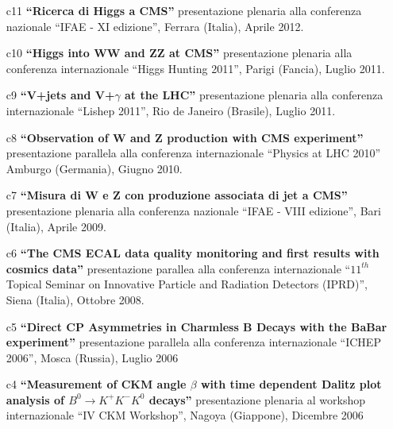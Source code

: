 \documentclass[11pt,twoside,a4paper]{article}
\begin{document}
\begin{enumerate}
\item [c11] \textbf{``Ricerca di Higgs a CMS''}
  presentazione plenaria alla conferenza nazionale ``IFAE - XI edizione'',
  Ferrara (Italia), Aprile 2012.
  \vspace{2mm}

\item [c10] \textbf{``Higgs into WW and ZZ at CMS''} presentazione
  plenaria alla conferenza internazionale ``Higgs Hunting 2011'',
  Parigi (Fancia), Luglio 2011.
  \vspace{2mm}

\item [c9] \textbf{``V+jets and V+$\gamma$ at the LHC''} presentazione
  plenaria alla conferenza internazionale ``Lishep 2011'', Rio de
  Janeiro (Brasile), Luglio 2011.
  \vspace{2mm}

\item [c8] \textbf{``Observation of W and Z production with CMS
  experiment'' } presentazione parallela alla conferenza
  internazionale ``Physics at LHC 2010'' Amburgo (Germania), Giugno
  2010.
  \vspace{2mm}

\item [c7] \textbf{``Misura di W e Z con produzione associata di jet a
  CMS''} presentazione plenaria alla conferenza nazionale ``IFAE -
  VIII edizione'', Bari (Italia), Aprile 2009.
  \vspace{2mm}

\item [c6] \textbf{``The CMS ECAL data quality monitoring and first
  results with cosmics data''} presentazione parallea alla conferenza
  internazionale ``$11^{th}$ Topical Seminar on Innovative Particle
  and Radiation Detectors (IPRD)'', Siena (Italia), Ottobre 2008.
  \vspace{2mm}

\item [c5] \textbf{``Direct CP Asymmetries in Charmless B Decays with the
  BaBar experiment''} presentazione parallela alla conferenza
  internazionale ``ICHEP 2006'', Mosca (Russia), Luglio 2006
  \vspace{2mm}

\item [c4] \textbf{``Measurement of CKM angle $\beta$ with time dependent
  Dalitz plot analysis of $B^0\rightarrow K^+K^-K^0$ decays''}
  presentazione plenaria al workshop internazionale ``IV CKM
  Workshop'', Nagoya (Giappone), Dicembre 2006


\end{enumerate}
\end{document}
